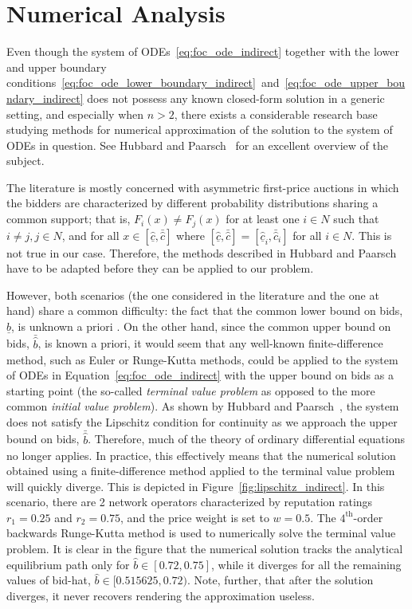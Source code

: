 \section{Numerical Analysis} %
\label{sec:numerical_analysis_indirect}
Even though the system of ODEs~\eqref{eq:foc_ode_indirect} together with the lower and upper boundary conditions~\eqref{eq:foc_ode_lower_boundary_indirect}~and~\eqref{eq:foc_ode_upper_boundary_indirect} does not possess any known closed-form solution in a generic setting, and especially when $n>2$, there exists a considerable research base studying methods for numerical approximation of the solution to the system of ODEs in question. See Hubbard and Paarsch~\cite{HubbardPaarsch2011} for an excellent overview of the subject.

The literature is mostly concerned with asymmetric first-price auctions in which the bidders are characterized by different probability distributions sharing a common support; that is, $F_i(x)\neq F_j(x)$ for at least one $i\in N$ such that $i\neq j, j\in N$, and for all $x\in [\underline{\hat{c}}, \bar{\hat{c}}]$ where $[\underline{\hat{c}}, \bar{\hat{c}}] = [\underline{\hat{c}}_i, \bar{\hat{c}}_i]$ for all $i\in N$. This is not true in our case. Therefore, the methods described in Hubbard and Paarsch~\cite{HubbardPaarsch2011} have to be adapted before they can be applied to our problem.

However, both scenarios (the one considered in the literature and the one at hand) share a common difficulty: the fact that the common lower bound on bids, $\underline{\hat{b}}$, is unknown a priori \cite{HubbardPaarsch2011}. On the other hand, since the common upper bound on bids, $\bar{\hat{b}}$, is known a priori, it would seem that any well-known finite-difference method, such as Euler or Runge-Kutta methods, could be applied to the system of ODEs in Equation~\eqref{eq:foc_ode_indirect} with the upper bound on bids as a starting point (the so-called \emph{terminal value problem} as opposed to the more common \emph{initial value problem}). As shown by Hubbard and Paarsch~\cite{HubbardPaarsch2011}, the system does not satisfy the Lipschitz condition for continuity as we approach the upper bound on bids, $\bar{\hat{b}}$. Therefore, much of the theory of ordinary differential equations no longer applies. In practice, this effectively means that the numerical solution obtained using a finite-difference method applied to the terminal value problem will quickly diverge. This is depicted in Figure~\ref{fig:lipschitz_indirect}. In this scenario, there are 2 network operators characterized by reputation ratings $r_1 = 0.25$ and $r_2 = 0.75$, and the price weight is set to $w=0.5$. The $4^{\textrm{th}}$-order backwards Runge-Kutta method is used to numerically solve the terminal value problem. It is clear in the figure that the numerical solution tracks the analytical equilibrium path only for $\hat{b}\in [0.72, 0.75]$, while it diverges for all the remaining values of bid-hat, $\hat{b}\in [0.515625, 0.72)$. Note, further, that after the solution diverges, it never recovers rendering the approximation useless.

